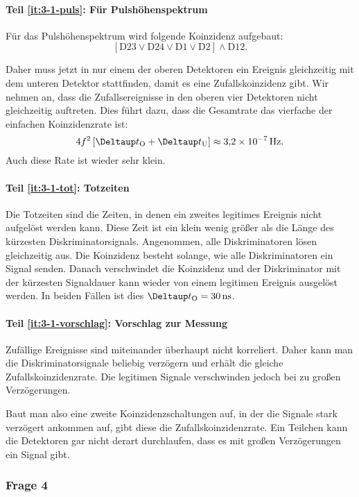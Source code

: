 \documentclass[11pt, ngerman, fleqn, DIV=15, headinclude, BCOR=2cm]{scrreprt}
\begin{document}
\paragraph{Teil \ref{it:3-1-puls}: Für Pulshöhenspektrum}

Für das Pulshöhenspektrum wird folgende Koinzidenz aufgebaut:
\[
    [\mathrm D23 \lor \mathrm D24 \lor \mathrm D1 \lor \mathrm D2] \land
    \mathrm D12.
\]

Daher muss jetzt in nur einem der oberen Detektoren ein Ereignis gleichzeitig
mit dem unteren Detektor stattfinden, damit es eine Zufallskoinzidenz gibt. Wir
nehmen an, dass die Zufallsereignisse in den oberen vier Detektoren nicht
gleichzeitig auftreten. Dies führt dazu, dass die Gesamtrate das vierfache der
einfachen Koinzidenzrate ist:
\[
    4 f^2 \sbr{\DtO + \DtU} \approx \SI{3.2e-7}{\hertz}.
\]
Auch diese Rate ist wieder sehr klein.

\paragraph{Teil \ref{it:3-1-tot}: Totzeiten}

Die Totzeiten sind die Zeiten, in denen ein zweites legitimes Ereignis nicht
aufgelöst werden kann. Diese Zeit ist ein klein wenig größer als die Länge des
kürzesten Diskriminatorsignals. Angenommen, alle Diskriminatoren lösen
gleichzeitig aus. Die Koinzidenz besteht solange, wie alle Diskriminatoren ein
Signal senden. Danach verschwindet die Koinzidenz und der Diskriminator mit der
kürzesten Signaldauer kann wieder von einem legitimen Ereignis ausgelöst
werden. In beiden Fällen ist dies $\DtO = \SI{30}{\nano\second}$.

\paragraph{Teil \ref{it:3-1-vorschlag}: Vorschlag zur Messung}

Zufällige Ereignisse sind miteinander überhaupt nicht korreliert. Daher kann
man die Diskriminatorsignale beliebig verzögern und erhält die gleiche
Zufallskoinzidenzrate. Die legitimen Signale verschwinden jedoch bei zu großen
Verzögerungen.

Baut man also eine zweite Koinzidenzschaltungen auf, in der die Signale stark
verzögert ankommen auf, gibt diese die Zufallskoinzidenzrate. Ein Teilchen kann
die Detektoren gar nicht derart durchlaufen, dass es mit großen Verzögerungen
ein Signal gibt.

\subsubsection{Frage 4}
\end{document}
